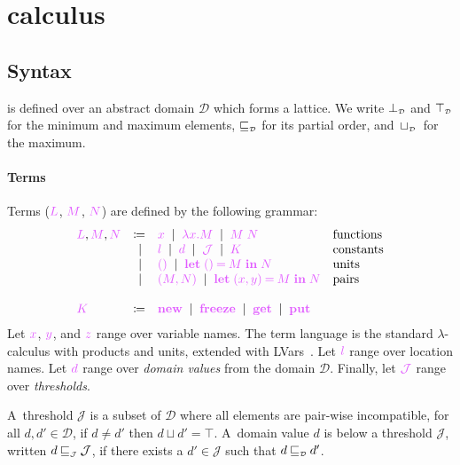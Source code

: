 \documentclass[main.tex]{subfiles}
\begin{document}
\section{\typedlambdalvar calculus}

\subsection{Syntax}%
\typedlambdalvar is defined over an abstract domain $\mathcal{D}$ which forms a lattice. We write ${\bot_{\scriptscriptstyle\mathcal{D}}}$ and ${\top_{\scriptscriptstyle\mathcal{D}}}$ for the minimum and maximum elements, $\mathbin{{\color{black}\sqsubseteq_{\scriptscriptstyle\mathcal{D}}}}$ for its partial order, and $\,{{\color{black}\sqcup_{\scriptscriptstyle\mathcal{D}}}}\,$ for the maximum.

\paragraph*{Terms}
Terms ($\tm{L}$, $\tm{M}$, $\tm{N}$) are defined by the following grammar:
\[
  \begin{array}{lrll}
  \tm{L}, \tm{M}, \tm{N}
  & \coloneqq & \tm{x}
    \sep        \tm{\lambda x.M}
    \sep        \tm{M\;N}                     & \text{functions} \\
  & \sep      & \tm{l}                        
    \sep        \tm{d}
    \sep        \tmJ
    \sep        \tm{K}                        & \text{constants} \\
  & \sep      & \tm{\unit}                    
    \sep        \tm{\letunit{M}{N}}           & \text{units} \\
  & \sep      & \tm{\pair{M}{N}}              
    \sep        \tm{\letpair{x}{y}{M}{N}}     & \text{pairs}
  \\
  \\
  \tm{K}
  & \coloneqq & \tm{\lvarnew}
    \sep        \tm{\lvarfreeze}
    \sep        \tm{\lvarget}
    \sep        \tm{\lvarput}
\end{array}
\]
Let $\tm{x}$, $\tm{y}$, and $\tm{z}$ range over variable names. The term language is the standard $\lambda$-calculus with products and units, extended with LVars~\citep{kuper15}. Let $\tm{l}$ range over location names. Let $\tm{d}$ range over \emph{domain values} from the domain $\mathcal{D}$. Finally, let $\tmJ$ range over \emph{thresholds}.

A~threshold $\mathcal{J}$ is a subset of $\mathcal{D}$ where all elements are pair-wise incompatible, \ie for all $d,d'\in\mathcal{D}$, if ${d}\neq{d'}$ then ${d}\sqcup{d'}={\top}$.
A~domain value $d$ is below a threshold $\mathcal{J}$, written ${d}\mathbin{{\color{black}\sqsubseteq_{\scriptscriptstyle\mathcal{J}}}}\mathcal{J}$, if there exists a ${d'}\in\mathcal{J}$ such that ${d}\mathbin{{\color{black}\sqsubseteq_{\scriptscriptstyle\mathcal{D}}}}{d'}$.
\end{document}
